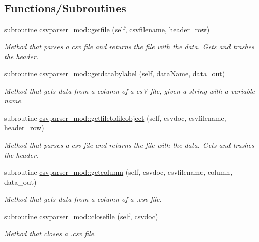 \subsection*{Functions/\+Subroutines}
\begin{DoxyCompactItemize}
\item 
subroutine \mbox{\hyperlink{namespacecsvparser__mod_abb79b5f7cda09a8a89eb9c5cb3fb126c}{csvparser\+\_\+mod\+::getfile}} (self, csvfilename, header\+\_\+row)
\begin{DoxyCompactList}\small\item\em Method that parses a csv file and returns the file with the data. Gets and trashes the header. \end{DoxyCompactList}\item 
subroutine \mbox{\hyperlink{namespacecsvparser__mod_aa7dbe42af8b97daccf58fc7be9939f60}{csvparser\+\_\+mod\+::getdatabylabel}} (self, data\+Name, data\+\_\+out)
\begin{DoxyCompactList}\small\item\em Method that gets data from a column of a csV file, given a string with a variable name. \end{DoxyCompactList}\item 
subroutine \mbox{\hyperlink{namespacecsvparser__mod_a29e2d40db736b6ff9fb100ef316e0ebe}{csvparser\+\_\+mod\+::getfiletofileobject}} (self, csvdoc, csvfilename, header\+\_\+row)
\begin{DoxyCompactList}\small\item\em Method that parses a csv file and returns the file with the data. Gets and trashes the header. \end{DoxyCompactList}\item 
subroutine \mbox{\hyperlink{namespacecsvparser__mod_ae966faafebb8c4035e12e0bb24de717c}{csvparser\+\_\+mod\+::getcolumn}} (self, csvdoc, csvfilename, column, data\+\_\+out)
\begin{DoxyCompactList}\small\item\em Method that gets data from a column of a .csv file. \end{DoxyCompactList}\item 
subroutine \mbox{\hyperlink{namespacecsvparser__mod_a8f56a69c948d139a3e9c88476f25305d}{csvparser\+\_\+mod\+::closefile}} (self, csvdoc)
\begin{DoxyCompactList}\small\item\em Method that closes a .csv file. \end{DoxyCompactList}\end{DoxyCompactItemize}
